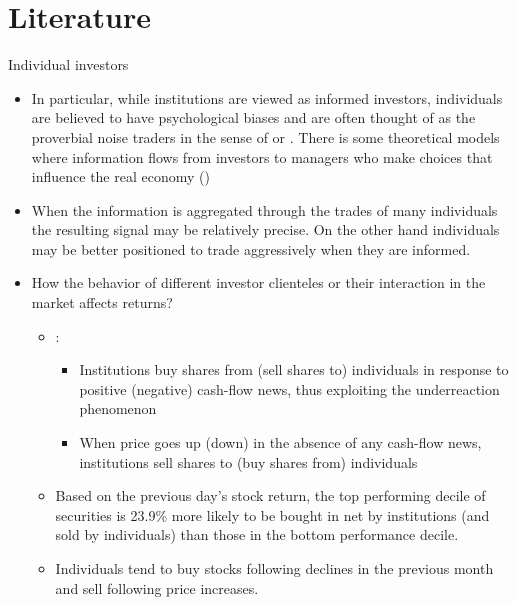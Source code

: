 \documentclass{beamer}
\begin{document}
	\section{Literature}
		\begin{frame}{Individual investors}
		\begin{itemize}\tiny
			\item In particular, while institutions are viewed as informed investors, individuals are believed to have psychological biases and are often
			thought of as the proverbial noise traders in the sense of \cite{kyle1985continuous} or \cite{black1986noise}. There is some theoretical models where information flows from investors to managers who make choices that influence the real economy (\cite{FOUCAULT2008146})
				\item  When the information is aggregated through the trades of many individuals the resulting signal may be relatively precise. On the other hand individuals
				may be better positioned to trade aggressively when they are informed.	\cite{kaniel2012individual}
			\item How the
			behavior of different investor clienteles or their interaction in the market affects
			returns?
			\begin{itemize}\tiny
				\item \cite{cohen2002underreacts}:
				\begin{itemize}\tiny
					\item Institutions buy shares from (sell
					shares to) individuals in response to positive (negative) cash-flow news, thus exploiting the
					underreaction phenomenon
					\item When price goes up (down) in the absence of any cash-flow news, institutions sell shares to
					(buy shares from) individuals
				\end{itemize}
				\item Based on the previous day’s stock return, the top performing decile
				of securities is 23.9\% more likely to be bought in net by institutions (and sold
				by individuals) than those in the bottom performance decile. \cite{griffin2003dynamics}
				\item  Individuals tend to buy stocks following declines in the previous month
				and sell following price increases. \cite{kaniel2008individual}
				
			\end{itemize}
			
		\end{itemize}
	\end{frame}
	
\end{document}
